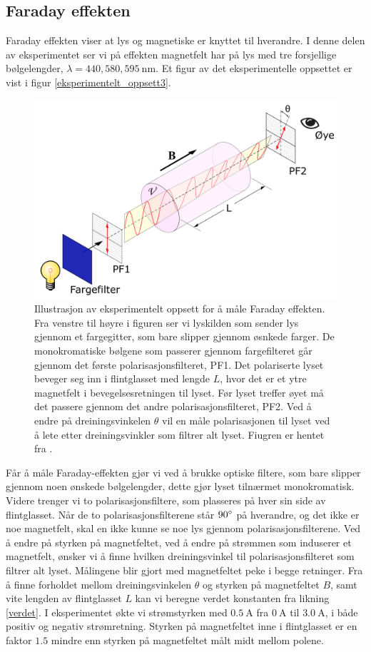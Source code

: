 \documentclass[%
 reprint,
 amsmath,amssymb,
 aps,
]{revtex4-1}
\begin{document}
\subsection{Faraday effekten}
Faraday effekten viser at lys og magnetiske er knyttet til hverandre. I denne delen av eksperimentet ser vi på effekten magnetfelt har på lys med tre forsjellige bølgelengder, $\lambda = 440, 580, \SI{595}{\nano\meter}$. Et figur av det eksperimentelle oppsettet er vist i figur \vref{eksperimentelt_oppsett3}.
\begin{figure}[h!]
  \centering
  \includegraphics[scale=0.3]{oppsett3.png}
  \caption{Illustrasjon av eksperimentelt oppsett for å måle Faraday effekten. Fra venstre til høyre i figuren ser vi lyskilden som sender lys gjennom et fargegitter, som bare slipper gjennom øsnkede farger. De monokromatiske bølgene som passerer gjennom fargefilteret går gjennom det første polarisasjonsfilteret, PF1. Det polariserte lyset beveger seg inn i flintglasset med lengde $L$, hvor det er et ytre magnetfelt i bevegelsesretningen til lyset. Før lyset treffer øyet må det passere gjennom det andre polarisasjonsfilteret, PF2. Ved å endre på dreiningsvinkelen $\theta$ vil en måle polarisasjonen til lyset ved å lete etter dreiningsvinkler som filtrer alt lyset.
  Fiugren er hentet fra \cite{oppgave}.}
  \label{eksperimentelt_oppsett2}
\end{figure}
Får å måle Faraday-effekten gjør vi ved å brukke optiske filtere, som bare slipper gjennom noen ønskede bølgelengder, dette gjør lyset tilnærmet monokromatisk. Videre trenger vi to polarisasjonsfiltere, som plasseres på hver sin side av flintglasset. Når de to polarisasjonsfilterene står $90\degree$ på hverandre, og det ikke er noe magnetfelt, skal en ikke kunne se noe lys gjennom polarisasjonsfilterene. Ved å endre på styrken på magnetfeltet, ved å endre på strømmen som induserer et magnetfelt, ønsker vi å finne hvilken dreiningsvinkel til polarisasjonsfilteret som filtrer alt lyset. Målingene blir gjort med magnetfeltet peke i begge retninger. Fra å finne forholdet mellom dreiningsvinkelen $\theta$ og styrken på magnetfeltet $B$, samt vite lengden av flintglasset $L$ kan vi beregne verdet konstanten fra likning \eqref{verdet}.
I eksperimentet økte vi strømstyrken med $\SI{0.5}{\ampere}$ fra $\SI{0}{\ampere}$ til $\SI{3.0}{\ampere}$, i både positiv og negativ strømretning. Styrken på magnetfeltet inne i flintglasset er en faktor $1.5$ mindre enn styrken på magnetfeltet målt midt mellom polene.
\end{document}

